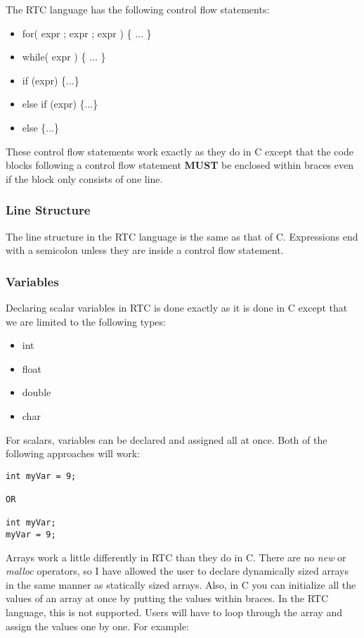 The RTC language has the following control flow statements:

\begin{itemize}
  \item for( expr ; expr ; expr ) \{ ... \}
  \item while( expr )  \{ ... \}
  \item if (expr) \{...\}
  \item else if (expr) \{...\}
  \item else \{...\}
\end{itemize}

\noindent These control flow statements work exactly as they do in C
except that the code blocks following a control flow statement
\textbf{MUST} be enclosed within braces even if the block only consists of
one line.

\subsubsection{Line Structure}

The line structure in the RTC language is the same as that of C. Expressions
end with a semicolon unless they are inside a control flow statement.

\subsubsection{Variables}

Declaring scalar variables in RTC is done exactly as it is done in C except
that we are limited to the following types:

\begin{itemize}
  \item int
  \item float
  \item double
  \item char
\end{itemize}

\noindent For scalars, variables can be declared and assigned all at once. Both of the
following approaches will work:

{\ttfamily \begin{verbatim}
int myVar = 9;

OR

int myVar;
myVar = 9;
\end{verbatim}
}

\noindent Arrays work a little differently in RTC than they do in C. There are
no \emph{new} or \emph{malloc} operators, so I have allowed the user to
declare dynamically sized arrays in the same manner as statically sized
arrays. Also, in C you can initialize all the values of an array at once by
putting the values within braces. In the RTC language, this is not supported.
Users will have to loop through the array and assign the values one by one.
For example:

